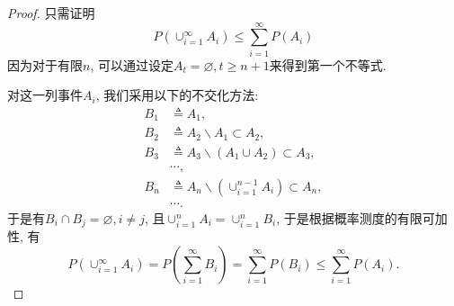 \documentclass[UTF8, a4paper]{article}
\begin{document}
\begin{proof}
只需证明
$$
P\left(\cup_{i=1}^{\infty} A_i\right) \leq \sum_{i=1}^{\infty} P\left(A_i\right)
$$
因为对于有限\(n\), 可以通过设定\(A_{t} = \varnothing, t\geq n+1\)来得到第一个不等式.

对这一列事件\(A_i\), 我们采用以下的不交化方法:
$$
\begin{aligned}
    B_1 & \triangleq A_1, \\
    B_2 & \triangleq A_2 \backslash A_1 \subset A_2, \\
    B_3 & \triangleq A_3 \backslash (A_1 \cup A_2) \subset A_3, \\
    & \cdots, \\
    B_n & \triangleq A_n \backslash \left(\cup_{i=1}^{n-1} A_i\right) \subset A_n, \\
    & \cdots.
\end{aligned}
$$
于是有\(B_i \cap B_j = \varnothing, i\neq j\), 且\(\cup_{i=1}^n A_i = \cup_{i=1}^n B_i\), 于是根据概率测度的有限可加性, 有
$$
P\left(\cup_{i=1}^{\infty} A_i\right) = P\left(\sum_{i=1}^{\infty} B_i\right) = \sum_{i=1}^{\infty} P(B_i) \leq \sum_{i=1}^{\infty} P(A_i).
$$


\end{proof}
\end{document}
